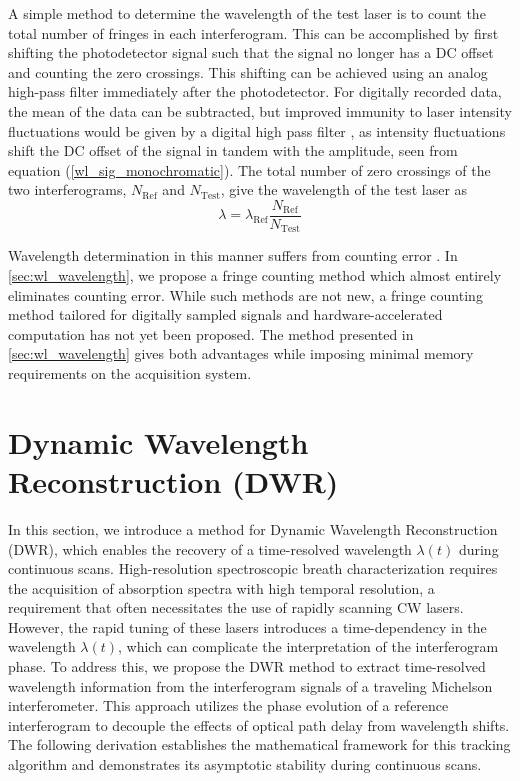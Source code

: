 \documentclass[12pt]{report}
\begin{document}
	A simple method to determine the wavelength of the test laser is to count the total number of fringes in each interferogram. This can be accomplished by first shifting the photodetector signal such that the signal no longer has a DC offset and counting the zero crossings. This shifting can be achieved using an analog high-pass filter \cite{Su_analogFilters} immediately after the photodetector. For digitally recorded data, the mean of the data can be subtracted, but improved immunity to laser intensity fluctuations would be given by a digital high pass filter \cite{digital_filter_handbook}, as intensity fluctuations shift the DC offset of the signal in tandem with the amplitude, seen from equation (\ref{wl_sig_monochromatic}). The total number of zero crossings of the two interferograms, $N_\mathrm{Ref}$ and $N_\mathrm{Test}$, give the wavelength of the test laser as
	\begin{equation} \label{wl_wavelength_simple}
		\lambda = \lambda_\mathrm{Ref} \frac{N_\mathrm{Ref}}{N_\mathrm{Test}}
	\end{equation}
	
	Wavelength determination in this manner suffers from counting error \cite{Demtroder2008}. In \ref{sec:wl_wavelength}, we propose a fringe counting method which almost entirely eliminates counting error. While such methods are not new, a fringe counting method tailored for digitally sampled signals and hardware-accelerated computation has not yet been proposed. The method presented in \ref{sec:wl_wavelength} gives both advantages while imposing minimal memory requirements on the acquisition system.
	
	\section{Dynamic Wavelength Reconstruction (DWR)} \label{sec:wl_tracking}
	
	In this section, we introduce a method for Dynamic Wavelength Reconstruction (DWR), which enables the recovery of a time-resolved wavelength $\lambda(t)$ during continuous scans. High-resolution spectroscopic breath characterization requires the acquisition of absorption spectra with high temporal resolution, a requirement that often necessitates the use of rapidly scanning CW lasers. However, the rapid tuning of these lasers introduces a time-dependency in the wavelength $\lambda(t)$, which can complicate the interpretation of the interferogram phase. To address this, we propose the DWR method to extract time-resolved wavelength information from the interferogram signals of a traveling Michelson interferometer. This approach utilizes the phase evolution of a reference interferogram to decouple the effects of optical path delay from wavelength shifts. The following derivation establishes the mathematical framework for this tracking algorithm and demonstrates its asymptotic stability during continuous scans.
	
\end{document}
